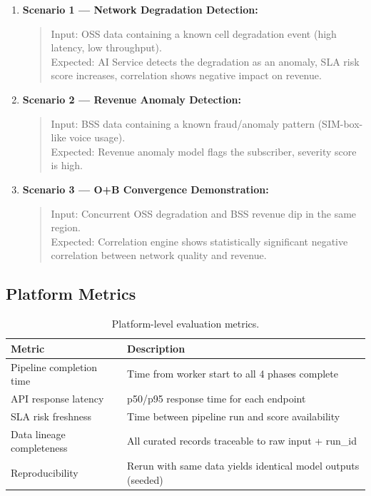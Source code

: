 \begin{enumerate}
  \item \textbf{Scenario 1 --- Network Degradation Detection:}
  \begin{quote}
    Input: OSS data containing a known cell degradation event (high latency, low throughput).\\
    Expected: AI Service detects the degradation as an anomaly, SLA risk score increases, correlation shows negative impact on revenue.
  \end{quote}
  
  \item \textbf{Scenario 2 --- Revenue Anomaly Detection:}
  \begin{quote}
    Input: BSS data containing a known fraud/anomaly pattern (SIM-box-like voice usage).\\
    Expected: Revenue anomaly model flags the subscriber, severity score is high.
  \end{quote}
  
  \item \textbf{Scenario 3 --- O+B Convergence Demonstration:}
  \begin{quote}
    Input: Concurrent OSS degradation and BSS revenue dip in the same region.\\
    Expected: Correlation engine shows statistically significant negative correlation between network quality and revenue.
  \end{quote}
\end{enumerate}

\subsection{Platform Metrics}

\begin{table}[H]
\centering
\caption{Platform-level evaluation metrics.}
\label{tab:platform-metrics}
\begin{tabularx}{\textwidth}{@{}lX@{}}
\toprule
\textbf{Metric} & \textbf{Description} \\
\midrule
Pipeline completion time & Time from worker start to all 4 phases complete \\
API response latency     & p50/p95 response time for each endpoint \\
SLA risk freshness       & Time between pipeline run and score availability \\
Data lineage completeness & All curated records traceable to raw input + run\_id \\
Reproducibility          & Rerun with same data yields identical model outputs (seeded) \\
\bottomrule
\end{tabularx}
\end{table}

